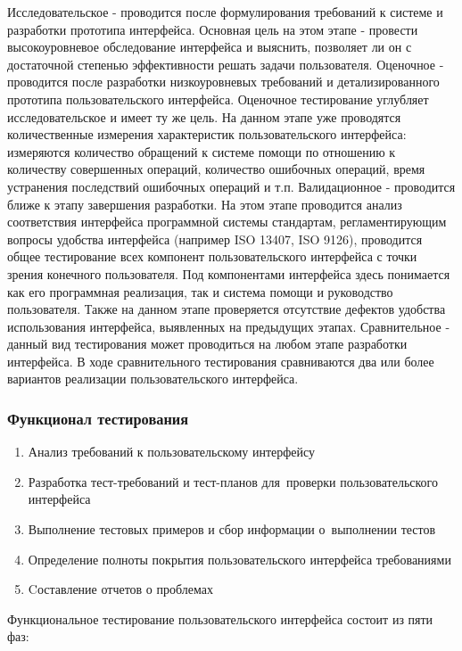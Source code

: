 \documentclass{../industrial-development}
\begin{document}
Исследовательское - проводится после формулирования требований к системе и разработки прототипа интерфейса. Основная цель на этом этапе - провести высокоуровневое обследование интерфейса и выяснить, позволяет ли он с достаточной степенью эффективности решать задачи пользователя.
Оценочное - проводится после разработки низкоуровневых требований и детализированного прототипа пользовательского интерфейса. Оценочное тестирование углубляет исследовательское и имеет ту же цель. На данном этапе уже проводятся количественные измерения характеристик пользовательского интерфейса: измеряются количество обращений к системе помощи по отношению к количеству совершенных операций, количество ошибочных операций, время устранения последствий ошибочных операций и т.п.
Валидационное - проводится ближе к этапу завершения разработки. На этом этапе проводится анализ соответствия интерфейса программной системы стандартам, регламентирующим вопросы удобства интерфейса (например ISO 13407, ISO 9126), проводится общее тестирование всех компонент пользовательского интерфейса с точки зрения конечного пользователя. Под компонентами интерфейса здесь понимается как его программная реализация, так и система помощи и руководство пользователя. Также на данном этапе проверяется отсутствие дефектов удобства использования интерфейса, выявленных на предыдущих этапах.
Сравнительное - данный вид тестирования может проводиться на любом этапе разработки интерфейса. В ходе сравнительного тестирования сравниваются два или более вариантов реализации пользовательского интерфейса.


\begin{frame} \frametitle{Функционал тестирования}
  \begin{enumerate}
  \item Анализ требований к пользовательскому интерфейсу
  \item Разработка тест-требований и тест-планов для~проверки пользовательского интерфейса
  \item Выполнение тестовых примеров и сбор информации о~выполнении тестов
  \item Определение полноты покрытия пользовательского интерфейса требованиями
  \item Cоставление отчетов о проблемах
  \end{enumerate}
\end{frame}

\lecturenotes

Функциональное тестирование пользовательского интерфейса состоит из пяти фаз:
\end{document}
